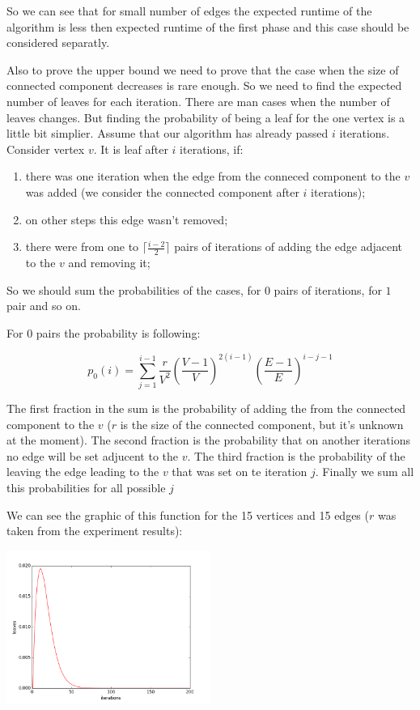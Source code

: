 \documentclass{llncs}
\begin{document}
  So we can see that for small number of edges the expected runtime of the algorithm is less then expected runtime of the first phase and this case should be considered separatly.
  
  Also to prove the upper bound we need to prove that the case when the size of connected component decreases is rare enough.
  So we need to find the expected number of leaves for each iteration.
  There are man cases when the number of leaves changes. But finding the probability of being a leaf for the one vertex is a little bit simplier.
  Assume that our algorithm has already passed $i$ iterations. Consider vertex $v$. It is leaf after $i$ iterations, if:
  \begin{enumerate}
   \item there was one iteration when the edge from the conneced component to the $v$ was added (we consider the connected component after $i$ iterations);
   \item on other steps this edge wasn't removed;
   \item there were from one to $\lceil \frac{i - 2}{2} \rceil$ pairs of iterations of adding the edge adjacent to the $v$ and removing it;
  \end{enumerate}
  
  So we should sum the probabilities of the cases, for $0$ pairs of iterations, for $1$ pair and so on.
  
  For $0$ pairs the probability is following:
  
  $$p_0(i) = \sum_{j = 1}^{i - 1} \frac{r}{V^2} \left(\frac{V - 1}{V} \right)^{2(i - 1)} \left(\frac{E - 1}{E}\right)^{i - j - 1}$$
  
  The first fraction in the sum is the probability of adding the from the connected component to the $v$ ($r$ is the size of the connected component, but it's unknown at the moment).
  The second fraction is the probability that on another iterations no edge will be set adjucent to the $v$.
  The third fraction is the probability of the leaving the edge leading to the $v$  that was set on te iteration $j$. Finally we sum all this probabilities for all possible $j$
  
  We can see the graphic of this function for the 15 vertices and 15 edges ($r$ was taken from the experiment results):
  
  \includegraphics[height=5cm]{pic/firstPart.png}
  
\end{document}
